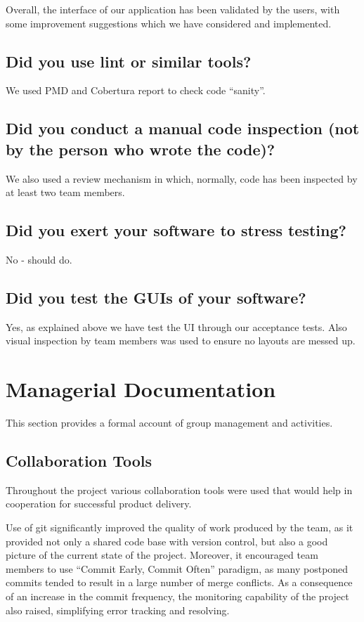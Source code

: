 \documentclass[10pt]{article}
\begin{document}
Overall, the interface of our application has been validated by the users, with some improvement suggestions which we have considered and implemented.


\subsection{Did you use lint or similar tools?}

We used PMD and Cobertura report to check code ``sanity''.

\subsection{Did you conduct a manual code inspection (not by the person who wrote the code)?}

We also used a review mechanism in which, normally, code has been inspected by at least two team members.

\subsection{Did you exert your software to stress testing?}

No - should do.

\subsection{Did you test the GUIs of your software?}

Yes, as explained above we have test the UI through our acceptance tests. Also visual inspection by team members was used to ensure no layouts are messed up.

\section{Managerial Documentation}

This section provides a formal account of group management and activities.

\subsection{Collaboration Tools}

Throughout the project various collaboration tools were used that would help in cooperation for successful product delivery.

Use of git significantly improved the quality of work produced by the team, as it provided not only a shared code base with version control, but also a good picture of the current state of the project. Moreover, it encouraged team members to use ``Commit Early, Commit Often'' paradigm, as many postponed commits tended to result in a large number of merge conflicts. As a consequence of an increase in the commit frequency, the monitoring capability of the project also raised, simplifying error tracking and resolving.
\end{document}
